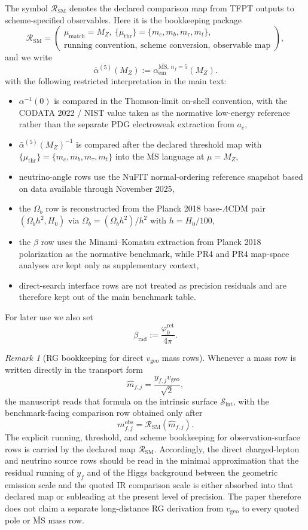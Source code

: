 \documentclass[11pt,a4paper]{article}
\theoremstyle{definition}
\theoremstyle{remark}
\newtheorem*{remark}{Remark}
\newcommand{\phiz}{\varphi_0^{\mathrm{ret}}}
\newcommand{\SM}{\mathrm{SM}}
\newcommand{\vgeo}{v_{\mathrm{geo}}}
\begin{document}
The symbol $\mathcal R_{\SM}$ denotes the declared comparison map from TFPT outputs to scheme-specified observables. Here it is the bookkeeping package
\[
\mathcal R_{\SM}
=
\left(
\begin{array}{l}
\mu_{\mathrm{match}}=M_Z,\ \{\mu_{\mathrm{thr}}\}=\{m_c,m_b,m_\tau,m_t\},\\
\text{running convention},\ \text{scheme conversion},\ \text{observable map}
\end{array}
\right),
\]
and we write
\[
\bar\alpha^{(5)}(M_Z):=\alpha_{\mathrm{em}}^{\overline{\mathrm{MS}},\,n_f=5}(M_Z).
\]
with the following restricted interpretation in the main text:
\begin{itemize}[leftmargin=1.5em, topsep=3pt, itemsep=2pt]
    \item $\alpha^{-1}(0)$ is compared in the Thomson-limit on-shell convention, with the CODATA 2022 / NIST value taken as the normative low-energy reference rather than the separate PDG electroweak extraction from $a_e$,
    \item $\bar\alpha^{(5)}(M_Z)^{-1}$ is compared after the declared threshold map with $\{\mu_{\mathrm{thr}}\}=\{m_c,m_b,m_\tau,m_t\}$ into the $\overline{\mathrm{MS}}$ language at $\mu=M_Z$,
    \item neutrino-angle rows use the NuFIT normal-ordering reference snapshot based on data available through November 2025,
    \item the $\Omega_b$ row is reconstructed from the Planck 2018 base-$\Lambda$CDM pair $(\Omega_b h^2,H_0)$ via $\Omega_b=(\Omega_b h^2)/h^2$ with $h=H_0/100$,
    \item the $\beta$ row uses the Minami--Komatsu extraction from Planck 2018 polarization as the normative benchmark, while PR4 and PR4 map-space analyses are kept only as supplementary context,
    \item direct-search interface rows are not treated as precision residuals and are therefore kept out of the main benchmark table.
\end{itemize}
For later use we also set
\[
\beta_{\mathrm{rad}}:=\frac{\phiz}{4\pi}.
\]

\begin{remark}[RG bookkeeping for direct \texorpdfstring{$\vgeo$}{vgeo} mass rows]
Whenever a mass row is written directly in the transport form
\[
\hat m_{f,j}=\frac{y_{f,j}\vgeo}{\sqrt2},
\]
the manuscript reads that formula on the intrinsic surface $\mathcal S_{\mathrm{int}}$, with the benchmark-facing comparison row obtained only after
\[
m_{f,j}^{\mathrm{obs}}=\mathcal R_{\SM}(\hat m_{f,j}).
\]
The explicit running, threshold, and scheme bookkeeping for observation-surface rows is carried by the declared map $\mathcal R_{\SM}$. Accordingly, the direct charged-lepton and neutrino source rows should be read in the minimal approximation that the residual running of $y_f$ and of the Higgs background between the geometric emission scale and the quoted IR comparison scale is either absorbed into that declared map or subleading at the present level of precision. The paper therefore does not claim a separate long-distance RG derivation from $\vgeo$ to every quoted pole or $\overline{\mathrm{MS}}$ mass row.
\end{remark}
\end{document}
